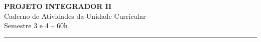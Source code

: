 \documentclass[12pt,a4paper]{article}
\begin{document}
\begin{center}
    {\Large \textbf{PROJETO INTEGRADOR II}}\\
    Caderno de Atividades da Unidade Curricular\\
    Semestre 3 e 4 – 60h
\end{center}

\vspace{0.5cm}
\hrule
\vspace{0.8cm}

\tableofcontents
\newpage




\newpage

\newpage

\newpage

\newpage

\end{document}
